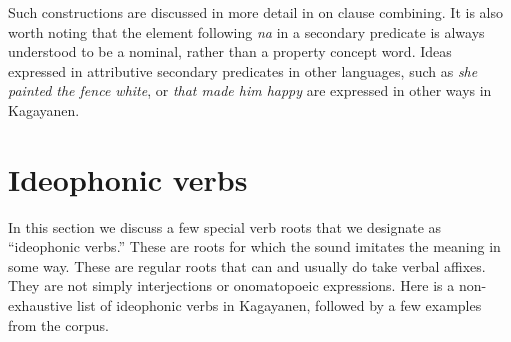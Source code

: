 Such constructions are discussed in more detail in  on clause combining. It is also worth noting that the element following \textit{na} in a secondary predicate is always understood to be a nominal, rather than a property concept word. Ideas expressed in attributive secondary predicates in other languages, such as \textit{she painted the fence white}, or \textit{that made him happy} are expressed in other ways in Kagayanen. 

\section{Ideophonic verbs}
\label{sec:ideophonicverbs}

In this section we discuss a few special verb roots that we designate as “ideophonic verbs.” These are roots for which the sound imitates the meaning in some way. These are regular roots that can and usually do take verbal affixes. They are not simply interjections or onomatopoeic expressions. Here is a non-exhaustive list of ideophonic verbs in Kagayanen, followed by a few examples from the corpus.

